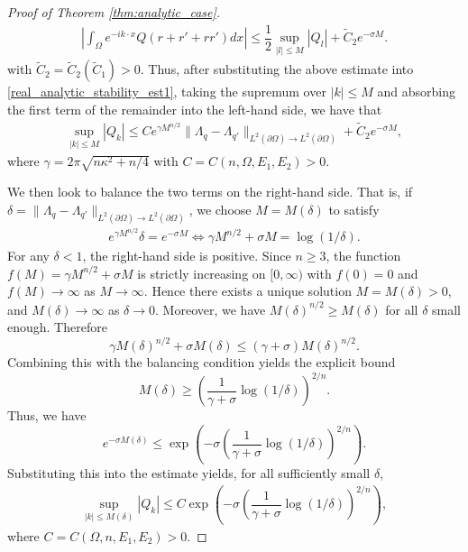 \documentclass[a4paper, 11pt, twoside, notitlepage]{amsart}
\theoremstyle{definition}
\theoremstyle{remark}
\newcommand {\p} {\partial}
\begin{document}
\begin{proof}[Proof of Theorem \ref{thm:analytic_case}]
\begin{align*}
    \left|\int_\Omega e^{-ik\cdot x}Q(r+r'+rr')dx\right| \leq \dfrac{1}{2}\sup_{|l|\leq M}|Q_l|+\widetilde{C}_2e^{-\sigma M}.
\end{align*}
with $\widetilde{C}_2=\widetilde{C}_2(\widetilde{C}_1)>0$. Thus, after substituting the above estimate into \eqref{real_analytic_stability_est1}, taking the supremum over $|k|\leq M$ and absorbing the first term of the remainder into the left-hand side, we have that 
\begin{align}
    \sup_{|k|\leq M}|Q_k|\leq C e^{\gamma M^{n/2}}\|\Lambda_q-\Lambda_{q'}\|_{L^2(\p\Omega)\rightarrow L^2(\p\Omega)}+\widetilde{C}_2 e^{-\sigma M},
\end{align}
where $\gamma = 2\pi\sqrt{n\kappa^2+n/4}$ with $C=C(n,\Omega,E_1,E_2)>0$. 





We then look to balance the two terms on the right-hand side. That is, if $\delta = \|\Lambda_q-\Lambda_{q'}\|_{L^2(\p\Omega)\rightarrow L^2(\p\Omega)}$, we choose $M = M(\delta)$ to satisfy
\begin{align*}
    e^{\gamma M^{n/2}} \delta = e^{-\sigma M} \iff \gamma M^{n/2}+\sigma M=\log(1/\delta).
\end{align*}
For any $\delta < 1$, the right-hand side is positive. Since $n\geq 3$, the function $f(M) = \gamma M^{n/2} + \sigma M$ is strictly increasing on $[0,\infty)$ with $f(0)=0$ and $f(M)\to\infty$ as $M\to\infty$. Hence there exists a unique solution $M = M(\delta) > 0$, and $M(\delta) \to \infty$ as $\delta \to 0$. Moreover, we have $M(\delta)^{n/2} \geq M(\delta)$ for all $\delta$ small enough. Therefore
\[
\gamma M(\delta)^{n/2} + \sigma M(\delta) \leq (\gamma + \sigma) M(\delta)^{n/2}.
\]
Combining this with the balancing condition yields the explicit bound 
\[
M(\delta)\geq \left(\frac{1}{\gamma+\sigma}\log(1/\delta)\right)^{2/n}.%
\]
Thus, we have
\[
e^{-\sigma M(\delta)} \leq \exp\left(-\sigma \left(\frac{1}{\gamma+\sigma}\log(1/\delta)\right)^{2/n}\right).
\]
Substituting this into the estimate yields, for all sufficiently small $\delta$,
\begin{align*}
    \sup_{|k|\leq M(\delta)} |Q_k| \leq C \exp\left(-\sigma \left(\dfrac{1}{\gamma+\sigma}\log(1/\delta)\right)^{2/n}\right),
\end{align*}
where $C = C(\Omega, n, E_1, E_2) > 0$.

\end{proof}
\end{document}

